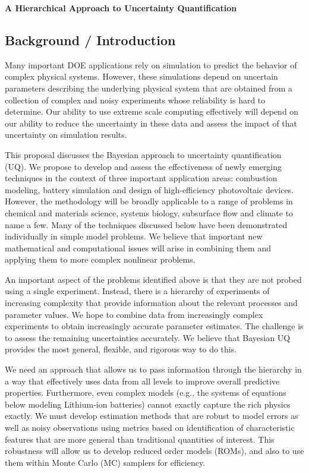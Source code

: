 \documentclass[11pt]{article}
\begin{document}
\begin{center}
{\large{\textbf{A Hierarchical Approach to Uncertainty Quantification}}}
\end{center}

\subsection*{Background / Introduction}

Many important DOE applications rely on simulation to predict the behavior of complex physical systems.
However, these simulations depend on uncertain parameters describing the underlying physical system
that are obtained from a collection of
complex and noisy experiments whose reliability is hard to determine. 
Our ability to use extreme scale computing effectively will depend on our ability to reduce the
uncertainty in these data and assess the impact of that uncertainty on simulation results.

This proposal discusses the Bayesian approach to uncertainty quantification (UQ).
We propose to develop and assess the effectiveness of newly emerging techniques in the 
context of three important application areas: combustion modeling, 
battery simulation and design of high-efficiency photovoltaic devices.
However, the methodology will be broadly applicable to a
range of problems in chemical and materials science, systems biology, subsurface flow and climate 
to name a few.
Many of the techniques discussed below have been demonstrated individually in simple model problems.
We believe that important new mathematical and computational issues will arise in combining them 
and applying them to more complex nonlinear problems.

An important aspect of the problems identified above is that they are not probed using a 
single experiment.  
Instead, there is a hierarchy of experiments of increasing complexity that provide 
information about the relevant processes and parameter values.
We hope to combine data from increasingly complex experiments to obtain increasingly accurate
parameter estimates.
The challenge is to assess the remaining uncertainties accurately.
We believe that Bayesian UQ provides the most general, flexible, and rigorous way to do this.

We need an approach that allows us to pass information through the hierarchy in a way that 
effectively uses data from all levels to improve overall predictive properties.
Furthermore, even complex models (e.g., the systems of equations below modeling Lithium-ion batteries)
cannot exactly capture the rich physics exactly.
We must develop estimation methods that are robust to model errors as well as noisy observations
using metrics based on identification of characteristic features that are more general than
traditional quantities of interest.
This robustness will allow us to develop reduced order models (ROMs), and also to use them 
within Monte Carlo (MC) samplers for efficiency. 
\end{document}

